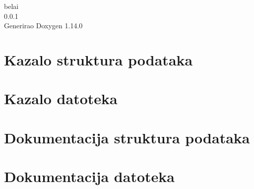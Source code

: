 \documentclass[twoside]{book}
\newcommand{\+}{\discretionary{\mbox{\scriptsize$\hookleftarrow$}}{}{}}
\newcommand{\clearemptydoublepage}{%
    \newpage{\pagestyle{empty}\cleardoublepage}%
  }
\begin{document}
  \raggedbottom
    \hypersetup{pageanchor=false,
                bookmarksnumbered=true,
                pdfencoding=unicode
               }
  \begin{titlepage}
  \vspace*{7cm}
  \begin{center}%
  {\Large belai}\\
  [1ex]\large 0.\+0.\+1 \\
  \vspace*{1cm}
  {\large Generirao Doxygen 1.14.0}\\
  \end{center}
  \end{titlepage}
  \clearemptydoublepage
  \tableofcontents
  \clearemptydoublepage
  \hypersetup{pageanchor=true}
\chapter{Kazalo struktura podataka}

\chapter{Kazalo datoteka}

\chapter{Dokumentacija struktura podataka}


\chapter{Dokumentacija datoteka}













  \backmatter
  \newpage
  \clearemptydoublepage
  \printindex
\end{document}
